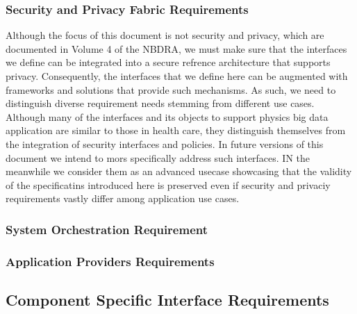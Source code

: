\documentclass[10pt]{article}
\begin{document}
\subsubsection{Security and Privacy Fabric Requirements}

Although the focus of this document is not security and privacy, which are documented in Volume 4 of the NBDRA, we must make sure that the interfaces we define can be integrated into a secure refrence architecture that supports privacy. Consequently, the interfaces that we define here can be augmented with frameworks and solutions that provide such mechanisms. As such, we need to distinguish diverse requirement needs stemming from different use cases. Although many of the interfaces and its objects to support physics big data application are similar to those in health care, they distinguish themselves from the integration of security interfaces and policies. In future versions of this document we intend to mors specifically address such interfaces. IN the meanwhile we consider them as an advanced usecase showcasing that the validity of the specificatins introduced here is preserved even if security and privaciy requirements vastly differ among application use cases.

\subsubsection{System Orchestration Requirement}


\subsubsection{Application Providers Requirements}


\subsection{Component Specific Interface Requirements}
\end{document}
